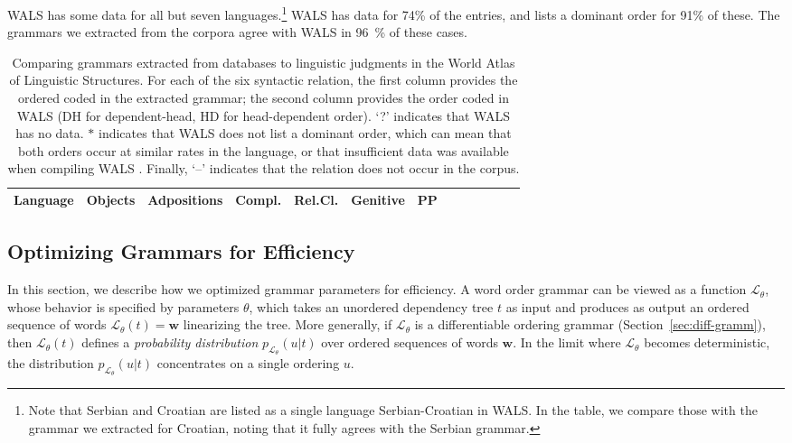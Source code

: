 \documentclass[10pt,twoside,lineno]{article}
\begin{document}
WALS has some data for all but seven languages.\footnote{Note that Serbian and Croatian are listed as a single language Serbian-Croatian in WALS. In the table, we compare those with the grammar we extracted for Croatian, noting that it fully agrees with the Serbian grammar.}
WALS has data for 74\% of the entries, and lists a dominant order for 91\% of these.
The grammars we extracted from the corpora agree with WALS in 96~\%  of these cases.


\begin{table}
\small{
\begin{center}
\begin{tabular}{l||ll|ll|ll|ll|ll|ll|llllll}
		   Language 
		   &	\multicolumn{2}{|c|}{Objects} 
		   &	\multicolumn{2}{|c|}{Adpositions} 
		   &	\multicolumn{2}{|c|}{Compl.} 
		   &	\multicolumn{2}{|c|}{Rel.Cl.} 
		   &	\multicolumn{2}{|c|}{Genitive} 
		   &	\multicolumn{2}{|c|}{PP}  \\ \hline\hline
	
\end{tabular}
\end{center}
}
\caption{Comparing grammars extracted from databases to linguistic judgments in the World Atlas of Linguistic Structures. For each of the six syntactic relation, the first column provides the ordered coded in the extracted grammar; the second column provides the order coded in WALS (DH for dependent-head, HD for head-dependent order). `?' indicates that WALS has no data.
$*$ indicates that WALS does not list a dominant order, which can mean that both orders occur at similar rates in the language, or that insufficient data was available when compiling WALS \citep{dryer2011evidence}.
Finally, `--' indicates that the relation does not occur in the corpus.
}\label{tab:grammars-wals}
\end{table}




\subsection{Optimizing Grammars for Efficiency}\label{sec:optim-eff}

In this section, we describe how we optimized grammar parameters for efficiency.
A word order grammar can be viewed as a function $\mathcal{L}_\theta$, whose behavior is specified by parameters $\theta$, which takes an unordered dependency tree $t$ as input and produces as output an ordered sequence of words $\mathcal{L}_\theta(t) = \mathbf{w}$ linearizing the tree.
More generally, if $\mathcal{L}_\theta$ is a differentiable ordering grammar (Section~\ref{sec:diff-gramm}), then $\mathcal{L}_\theta(t)$ defines a \emph{probability distribution} $p_{\mathcal{L}_\theta}(u|t)$ over ordered sequences of words $\mathbf{w}$.
In the limit where $\mathcal{L}_\theta$ becomes deterministic, the distribution $p_{\mathcal{L}_\theta}(u|t)$ concentrates on a single ordering $u$.
\end{document}
